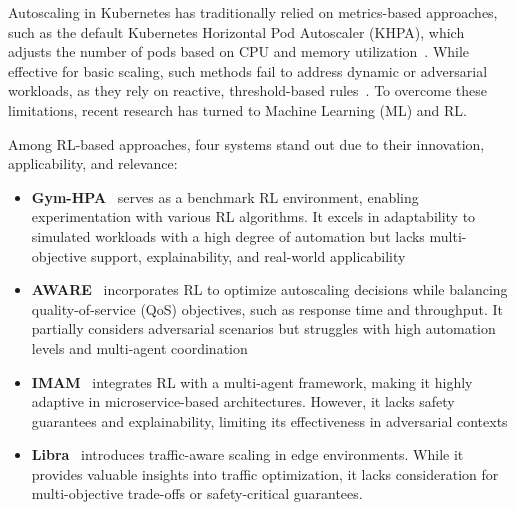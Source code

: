 \documentclass[conference]{IEEEtran}
\begin{document}
Autoscaling in Kubernetes has traditionally relied on metrics-based approaches, such as the default Kubernetes Horizontal Pod Autoscaler (KHPA), which adjusts the number of pods based on CPU and memory utilization~\cite{KubernetesChallenges}. While effective for basic scaling, such methods fail to address dynamic or adversarial workloads, as they rely on reactive, threshold-based rules~\cite{AutoscalingLimitations}. To overcome these limitations, recent research has turned to Machine Learning (ML) and RL.

Among RL-based approaches, four systems stand out due to their innovation, applicability, and relevance:
%
\begin{itemize}
    \item \textbf{Gym-HPA}~\cite{GymHPA} serves as a benchmark RL environment, enabling experimentation with various RL algorithms. It excels in adaptability to simulated workloads with a high degree of automation but lacks multi-objective support, explainability, and real-world applicability
    \item \textbf{AWARE}~\cite{AWARE} incorporates RL to optimize autoscaling decisions while balancing quality-of-service (QoS) objectives, such as response time and throughput. It partially considers adversarial scenarios but struggles with high automation levels and multi-agent coordination
    \item \textbf{IMAM}~\cite{IMAM} integrates RL with a multi-agent framework, making it highly adaptive in microservice-based architectures. However, it lacks safety guarantees and explainability, limiting its effectiveness in adversarial contexts
    \item \textbf{Libra}~\cite{Libra} introduces traffic-aware scaling in edge environments. While it provides valuable insights into traffic optimization, it lacks consideration for multi-objective trade-offs or safety-critical guarantees.
\end{itemize}
\end{document}
